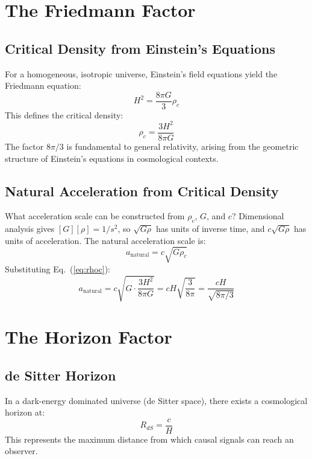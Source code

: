 \documentclass[twocolumn,showpacs,preprintnumbers,amsmath,amssymb,prd]{revtex4-2}
\begin{document}
\section{The Friedmann Factor}

\subsection{Critical Density from Einstein's Equations}

For a homogeneous, isotropic universe, Einstein's field equations yield the Friedmann equation:
\begin{equation}
H^2 = \frac{8\pi G}{3}\rho_c
\end{equation}
This defines the critical density:
\begin{equation}
\rho_c = \frac{3H^2}{8\pi G}
\label{eq:rhoc}
\end{equation}
The factor $8\pi/3$ is fundamental to general relativity, arising from the geometric structure of Einstein's equations in cosmological contexts.

\subsection{Natural Acceleration from Critical Density}

What acceleration scale can be constructed from $\rho_c$, $G$, and $c$? Dimensional analysis gives $[G][\rho] = 1/s^2$, so $\sqrt{G\rho}$ has units of inverse time, and $c\sqrt{G\rho}$ has units of acceleration. The natural acceleration scale is:
\begin{equation}
a_{\text{natural}} = c\sqrt{G\rho_c}
\end{equation}
Substituting Eq.~(\ref{eq:rhoc}):
\begin{equation}
a_{\text{natural}} = c\sqrt{G \cdot \frac{3H^2}{8\pi G}} = cH\sqrt{\frac{3}{8\pi}} = \frac{cH}{\sqrt{8\pi/3}}
\label{eq:anatural}
\end{equation}

\section{The Horizon Factor}

\subsection{de Sitter Horizon}

In a dark-energy dominated universe (de Sitter space), there exists a cosmological horizon at:
\begin{equation}
R_{dS} = \frac{c}{H}
\end{equation}
This represents the maximum distance from which causal signals can reach an observer.
\end{document}
